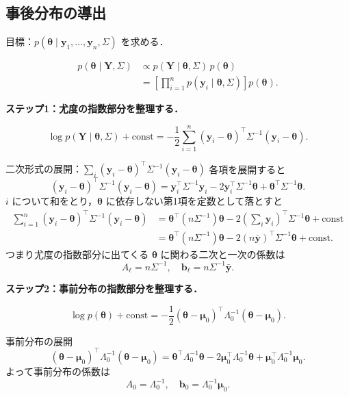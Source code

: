 \documentclass[lualatex,ja=standard,a4paper,12pt]{bxjsarticle}
\begin{document}
\subsection{事後分布の導出}

目標：$p(\bm{\theta} \mid \bm{y}_1, \ldots, \bm{y}_n, \Sigma)$ を求める．

\begin{align*}
  p(\bm{\theta} \mid \bm{Y}, \Sigma)
  &\propto p(\bm{Y} \mid \bm{\theta}, \Sigma)\, p(\bm{\theta}) \\
  &= \left[\prod_{i=1}^n p(\bm{y}_i \mid \bm{\theta}, \Sigma)\right] p(\bm{\theta}).
\end{align*}

\textbf{ステップ1：尤度の指数部分を整理する．}

\[
  \log p(\bm{Y} \mid \bm{\theta}, \Sigma) + \text{const}
  = -\frac{1}{2} \sum_{i=1}^n (\bm{y}_i - \bm{\theta})^\top \Sigma^{-1} (\bm{y}_i - \bm{\theta}).
\]

\begin{derivbox}{二次形式の展開：$\sum_i (\bm{y}_i - \bm{\theta})^\top \Sigma^{-1} (\bm{y}_i - \bm{\theta})$}
各項を展開すると
\[
  (\bm{y}_i - \bm{\theta})^\top \Sigma^{-1} (\bm{y}_i - \bm{\theta})
  = \bm{y}_i^\top \Sigma^{-1} \bm{y}_i
    - 2\bm{y}_i^\top \Sigma^{-1} \bm{\theta}
    + \bm{\theta}^\top \Sigma^{-1} \bm{\theta}.
\]
$i$ について和をとり，$\bm{\theta}$ に依存しない第1項を定数として落とすと
\begin{align*}
  \sum_{i=1}^n (\bm{y}_i - \bm{\theta})^\top \Sigma^{-1}(\bm{y}_i - \bm{\theta})
  &= \bm{\theta}^\top(n\Sigma^{-1})\bm{\theta} - 2\left(\sum_i \bm{y}_i\right)^\top \Sigma^{-1}\bm{\theta} + \text{const} \\
  &= \bm{\theta}^\top(n\Sigma^{-1})\bm{\theta} - 2(n\bar{\bm{y}})^\top \Sigma^{-1}\bm{\theta} + \text{const}.
\end{align*}
つまり尤度の指数部分に出てくる $\bm{\theta}$ に関わる二次と一次の係数は
\[
  A_{\ell} = n\Sigma^{-1}, \quad \bm{b}_{\ell} = n\Sigma^{-1}\bar{\bm{y}}.
\]
\end{derivbox}

\textbf{ステップ2：事前分布の指数部分を整理する．}

\[
  \log p(\bm{\theta}) + \text{const}
  = -\frac{1}{2}(\bm{\theta} - \bm{\mu}_0)^\top \Lambda_0^{-1}(\bm{\theta} - \bm{\mu}_0).
\]

\begin{derivbox}{事前分布の展開}
\[
  (\bm{\theta} - \bm{\mu}_0)^\top \Lambda_0^{-1}(\bm{\theta} - \bm{\mu}_0)
  = \bm{\theta}^\top \Lambda_0^{-1} \bm{\theta}
    - 2\bm{\mu}_0^\top \Lambda_0^{-1}\bm{\theta}
    + \bm{\mu}_0^\top \Lambda_0^{-1}\bm{\mu}_0.
\]
よって事前分布の係数は
\[
  A_0 = \Lambda_0^{-1}, \quad \bm{b}_0 = \Lambda_0^{-1}\bm{\mu}_0.
\]
\end{derivbox}
\end{document}
